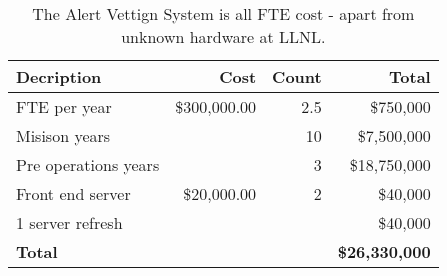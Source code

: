 \tiny \begin{longtable} {|l|r|r|r|} \caption{The Alert Vettign System is all FTE cost - apart from unknown hardware at LLNL. \label{tab:eliminate}}\\ 
\hline 
\textbf{Decription}&\textbf{Cost}&\textbf{Count}&\textbf{Total} \\ \hline
{FTE per year}&{\$300,000.00}&{2.5}&{\$750,000} \\ \hline
{Misison years}&{}&{10}&{\$7,500,000} \\ \hline
{Pre operations years}&{}&{3}&{\$18,750,000} \\ \hline
{Front end server}&{\$20,000.00}&{2}&{\$40,000} \\ \hline
{1 server refresh }&{}&{}&{\$40,000} \\ \hline
\textbf{Total}&\textbf{}&\textbf{}&\textbf{\$26,330,000} \\ \hline
\end{longtable} \normalsize
